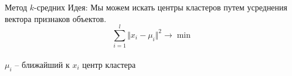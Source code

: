 \documentclass[10pt]{beamer}
\begin{document}
%
%


{
\begin{frame}{Метод $k$-средних}
	\alert{Идея}: Мы можем искать центры кластеров путем усреднения вектора признаков объектов.
	\pause
	\bigbreak
	$${\sum\limits_{i = 1}^l \Vert x_i -\mu_i \Vert^2 \rightarrow \min}$$\\
	\bigbreak
	$\mu_i$ -- ближайший к $x_i$ центр кластера
\end{frame}
}
\end{document}
